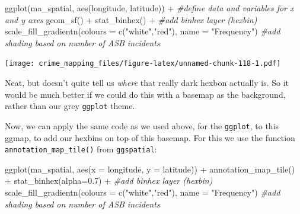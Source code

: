 \documentclass[
]{book}
\newenvironment{Shaded}{\begin{snugshade}}{\end{snugshade}}
\newcommand{\AttributeTok}[1]{\textcolor[rgb]{0.77,0.63,0.00}{#1}}
\newcommand{\CommentTok}[1]{\textcolor[rgb]{0.56,0.35,0.01}{\textit{#1}}}
\newcommand{\FloatTok}[1]{\textcolor[rgb]{0.00,0.00,0.81}{#1}}
\newcommand{\FunctionTok}[1]{\textcolor[rgb]{0.00,0.00,0.00}{#1}}
\newcommand{\NormalTok}[1]{#1}
\newcommand{\SpecialCharTok}[1]{\textcolor[rgb]{0.00,0.00,0.00}{#1}}
\newcommand{\StringTok}[1]{\textcolor[rgb]{0.31,0.60,0.02}{#1}}
\begin{document}
\begin{Shaded}
\begin{Highlighting}[]
\FunctionTok{ggplot}\NormalTok{(ma\_spatial, }\FunctionTok{aes}\NormalTok{(longitude, latitude)) }\SpecialCharTok{+}                        \CommentTok{\#define data and variables for x and y axes}
  \FunctionTok{geom\_sf}\NormalTok{() }\SpecialCharTok{+} 
  \FunctionTok{stat\_binhex}\NormalTok{() }\SpecialCharTok{+}                                                         \CommentTok{\#add binhex layer (hexbin)}
  \FunctionTok{scale\_fill\_gradientn}\NormalTok{(}\AttributeTok{colours =} \FunctionTok{c}\NormalTok{(}\StringTok{"white"}\NormalTok{,}\StringTok{"red"}\NormalTok{), }\AttributeTok{name =} \StringTok{"Frequency"}\NormalTok{)    }\CommentTok{\#add shading based on number of ASB incidents}
\end{Highlighting}
\end{Shaded}

\texttt{[image: crime\_mapping\_files/figure-latex/unnamed-chunk-118-1.pdf]}

Neat, but doesn't quite tell us \emph{where} that really dark hexbon actually is. So it would be much better if we could do this with a basemap as the background, rather than our grey \texttt{ggplot} theme.

Now, we can apply the same code as we used above, for the \texttt{ggplot}, to this ggmap, to add our hexbins on top of this basemap. For this we use the function \texttt{annotation\_map\_tile()} from \texttt{ggspatial}:

\begin{Shaded}
\begin{Highlighting}[]
\FunctionTok{ggplot}\NormalTok{(ma\_spatial, }\FunctionTok{aes}\NormalTok{(}\AttributeTok{x =}\NormalTok{ longitude, }\AttributeTok{y =}\NormalTok{ latitude)) }\SpecialCharTok{+}
  \FunctionTok{annotation\_map\_tile}\NormalTok{() }\SpecialCharTok{+} 
  \FunctionTok{stat\_binhex}\NormalTok{(}\AttributeTok{alpha=}\FloatTok{0.7}\NormalTok{) }\SpecialCharTok{+}                                                         \CommentTok{\#add binhex layer (hexbin)}
  \FunctionTok{scale\_fill\_gradientn}\NormalTok{(}\AttributeTok{colours =} \FunctionTok{c}\NormalTok{(}\StringTok{"white"}\NormalTok{,}\StringTok{"red"}\NormalTok{), }\AttributeTok{name =} \StringTok{"Frequency"}\NormalTok{)    }\CommentTok{\#add shading based on number of ASB incidents }
\end{Highlighting}
\end{Shaded}
\end{document}
